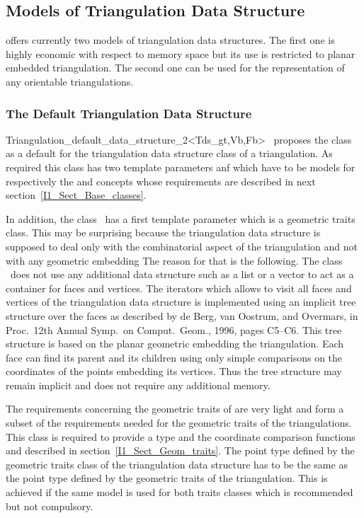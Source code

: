 \subsection{Models of Triangulation Data Structure}
\cgal offers currently two models of triangulation data structures.
The first one 
is highly economic with respect to memory space but its use is
restricted
to planar embedded triangulation. The second one
 can be used for 
the representation of any  orientable triangulations.

\subsubsection{The Default Triangulation Data Structure}
\begin{ccClassTemplate}{Triangulation_default_data_structure_2<Tds_gt,Vb,Fb>}
\cgal\ proposes the class 
as a default for the triangulation data structure class of a triangulation.
As required this class has two template parameters  anf 
which have 
to be models for respectively the
 and  concepts whose requirements are described in next 
section~\ref{I1_Sect_Base_classes}. 

In addition, the class \ccClassTemplateName\ has a first template parameter
which is a geometric traits class. This may be surprising because
the triangulation data structure is supposed to deal only with the combinatorial
aspect of the triangulation and not with any geometric embedding
The reason for that is the following.
The class \ccClassTemplateName\ does not use any additional data structure
such as a list or a vector to act as a container for faces and vertices.
The iterators which allows to visit all faces and vertices of the
triangulation
data structure
is implemented using  an implicit tree structure over the faces
as described by
 de Berg, van Oostrum, and Overmars, 
in Proc.\ 12th Annual Symp.\ on Comput.\ Geom.,
1996, pages C5--C6. This tree structure is  based on the planar
geometric embedding
the triangulation. Each face 
 can find its parent 
and its children using only simple comparisons on the
coordinates of the points embedding its vertices.
Thus the tree structure may remain implicit 
and does not require any additional memory. 

The requirements concerning the geometric traits  of
 are very light and form a subset of the requirements needed
for the geometric traits of the triangulations. 
This class is required  to provide a type 
and the coordinate comparison functions  and
described in section~\ref{I1_Sect_Geom_traits}. The point type
defined by the geometric traits class of the triangulation data structure
has to be the same 
as the point type defined by the geometric traits of the triangulation.
This is achieved if the same model is used for both traits classes
which is recommended but not compulsory.



\end{ccClassTemplate}
